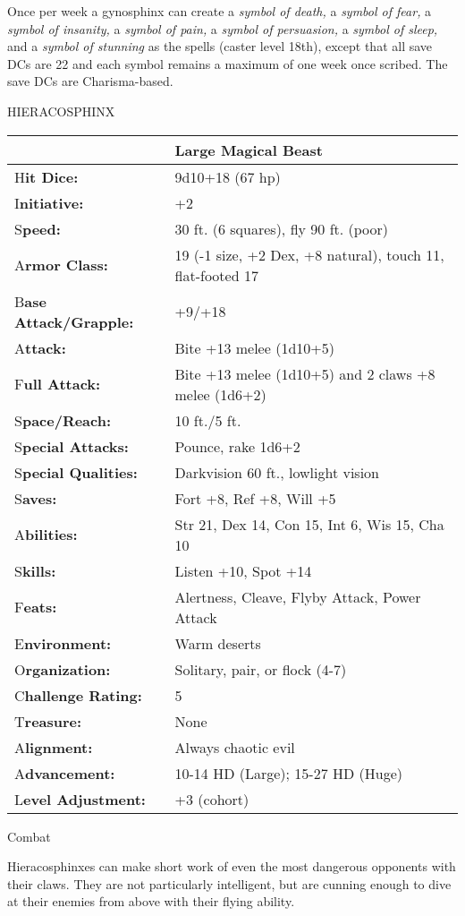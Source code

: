 \documentclass{article}
\begin{document}
Once per week a gynosphinx can create a \textit{symbol of death, }a \textit{symbol 
of fear, }a \textit{symbol of insanity, }a \textit{symbol of pain, }a \textit{symbol 
of persuasion, }a \textit{symbol of sleep, }and a \textit{symbol of stunning }as 
the spells (caster level 18th), except that all save DCs are 22 and each symbol 
remains a maximum of one week once scribed. The save DCs are Charisma-based.

\vspace{12pt}
HIERACOSPHINX

\begin{tabular}{|>{\raggedright}p{91pt}|>{\raggedright}p{226pt}|}
\hline
  & Large Magical Beast\tabularnewline
\hline
H\textbf{it Dice:} & 9d10+18 (67 hp)\tabularnewline
\hline
I\textbf{nitiative:} & +2\tabularnewline
\hline
S\textbf{peed:} & 30 ft. (6 squares), fly 90 ft. (poor)\tabularnewline
\hline
A\textbf{rmor Class:} & 19 (-1 size, +2 Dex, +8 natural), touch 11, flat-footed 
17\tabularnewline
\hline
B\textbf{ase Attack/Grapple:} & +9/+18\tabularnewline
\hline
A\textbf{ttack:} & Bite +13 melee (1d10+5)\tabularnewline
\hline
F\textbf{ull Attack:} & Bite +13 melee (1d10+5) and 2 claws +8 melee (1d6+2)\tabularnewline
\hline
S\textbf{pace/Reach:} & 10 ft./5 ft.\tabularnewline
\hline
S\textbf{pecial Attacks:} & Pounce, rake 1d6+2\tabularnewline
\hline
S\textbf{pecial Qualities:} & Darkvision 60 ft., lowlight vision\tabularnewline
\hline
S\textbf{aves:} & Fort +8, Ref +8, Will +5\tabularnewline
\hline
A\textbf{bilities:} & Str 21, Dex 14, Con 15, Int 6, Wis 15, Cha 10\tabularnewline
\hline
S\textbf{kills:} & Listen +10, Spot +14 \tabularnewline
\hline
F\textbf{eats:} & Alertness, Cleave, Flyby Attack, Power Attack\tabularnewline
\hline
E\textbf{nvironment:} & Warm deserts\tabularnewline
\hline
O\textbf{rganization:} & Solitary, pair, or flock (4-7)\tabularnewline
\hline
C\textbf{hallenge Rating:} & 5\tabularnewline
\hline
T\textbf{reasure:} & None\tabularnewline
\hline
A\textbf{lignment:} & Always chaotic evil\tabularnewline
\hline
A\textbf{dvancement:} & 10-14 HD (Large); 15-27 HD (Huge)\tabularnewline
\hline
L\textbf{evel Adjustment:} & +3 (cohort)\tabularnewline
\hline
\end{tabular}

Combat

Hieracosphinxes can make short work of even the most dangerous opponents with their 
claws. They are not particularly intelligent, but are cunning enough to dive at 
their enemies from above with their flying ability.
\end{document}
